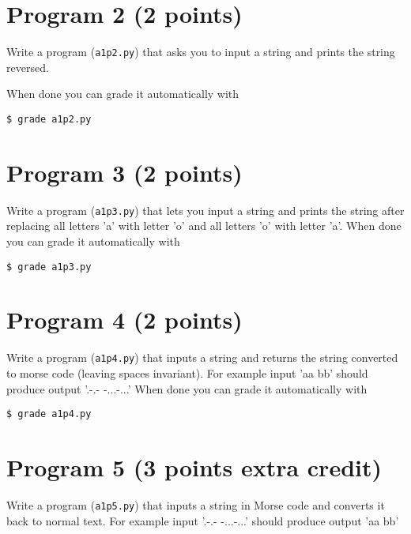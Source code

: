 \documentclass[12pt]{article}
\begin{document}
\section{Program 2 (2 points)}

\noindent Write a program ({\tt a1p2.py}) 
that asks you to input a string and prints the string reversed.

\noindent When done you can grade it automatically with
\begin{verbatim}
$ grade a1p2.py
\end{verbatim}

\section{Program 3 (2 points)}

\noindent Write a program ({\tt a1p3.py})
that lets you input a string and prints the string after
replacing all letters 'a' with letter 'o' and all letters 'o' with letter 'a'.
When done you can grade it automatically with
\begin{verbatim}
$ grade a1p3.py
\end{verbatim}

\section{Program 4 (2 points)}
\noindent Write a program ({\tt a1p4.py})
that inputs a string and returns the string converted 
to morse code (leaving spaces invariant).
For example input 'aa bb' should produce output '.-.- -...-...'
When done you can grade it automatically with
\begin{verbatim}
$ grade a1p4.py  
\end{verbatim}

\section{Program 5 (3 points extra credit)}
\noindent Write a program ({\tt a1p5.py})
that inputs a string in Morse code and converts it back to normal text.
For example input '.-.- -...-...' should produce output 'aa bb'
\end{document}
